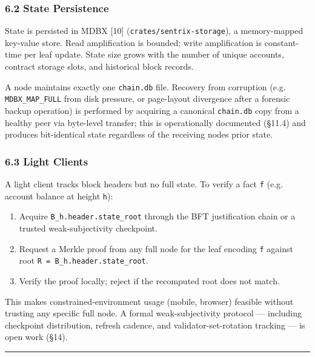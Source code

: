 \documentclass[11pt,a4paper]{article}
\providecommand{\tightlist}{\setlength{\itemsep}{0pt}\setlength{\parskip}{0pt}}
\begin{document}
\hypertarget{62-state-persistence}{%
\subsubsection{6.2 State Persistence}\label{62-state-persistence}}

State is persisted in MDBX {[}10{]} (\texttt{crates/sentrix-storage}), a
memory-mapped key-value store. Read amplification is bounded; write
amplification is constant-time per leaf update. State size grows with
the number of unique accounts, contract storage slots, and historical
block records.

A node maintains exactly one \texttt{chain.db} file. Recovery from
corruption (e.g. \texttt{MDBX\_MAP\_FULL} from disk pressure, or
page-layout divergence after a forensic backup operation) is performed
by acquiring a canonical \texttt{chain.db} copy from a healthy peer via
byte-level transfer; this is operationally documented (§11.4) and
produces bit-identical state regardless of the receiving
node\textquotesingle s prior state.

\hypertarget{63-light-clients}{%
\subsubsection{6.3 Light Clients}\label{63-light-clients}}

A light client tracks block headers but no full state. To verify a fact
\texttt{f} (e.g. account balance at height \texttt{h}):

\begin{enumerate}
\def\labelenumi{\arabic{enumi}.}
\tightlist
\item
  Acquire \texttt{B\_h.header.state\_root} through the BFT justification
  chain or a trusted weak-subjectivity checkpoint.
\item
  Request a Merkle proof from any full node for the leaf encoding
  \texttt{f} against root \texttt{R\ =\ B\_h.header.state\_root}.
\item
  Verify the proof locally; reject if the recomputed root does not
  match.
\end{enumerate}

This makes constrained-environment usage (mobile, browser) feasible
without trusting any specific full node. A formal weak-subjectivity
protocol --- including checkpoint distribution, refresh cadence, and
validator-set-rotation tracking --- is open work (§14).

\begin{center}\rule{0.5\linewidth}{0.5pt}\end{center}
\end{document}
